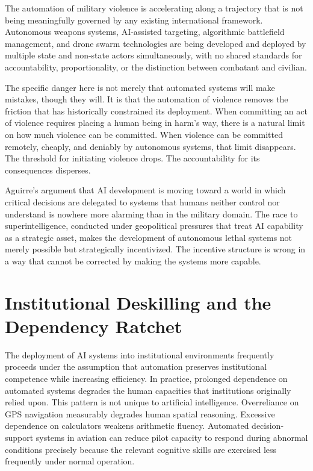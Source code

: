 \documentclass[12pt, a4paper]{article}
\theoremstyle{remark}
\begin{document}
The automation of military violence is accelerating along a trajectory that is not being meaningfully governed by any existing international framework. Autonomous weapons systems, AI-assisted targeting, algorithmic battlefield management, and drone swarm technologies are being developed and deployed by multiple state and non-state actors simultaneously, with no shared standards for accountability, proportionality, or the distinction between combatant and civilian.

The specific danger here is not merely that automated systems will make mistakes, though they will. It is that the automation of violence removes the friction that has historically constrained its deployment. When committing an act of violence requires placing a human being in harm's way, there is a natural limit on how much violence can be committed. When violence can be committed remotely, cheaply, and deniably by autonomous systems, that limit disappears. The threshold for initiating violence drops. The accountability for its consequences disperses.

Aguirre's argument that AI development is moving toward a world in which critical decisions are delegated to systems that humans neither control nor understand is nowhere more alarming than in the military domain. The race to superintelligence, conducted under geopolitical pressures that treat AI capability as a strategic asset, makes the development of autonomous lethal systems not merely possible but strategically incentivized. The incentive structure is wrong in a way that cannot be corrected by making the systems more capable.

\section{Institutional Deskilling and the Dependency Ratchet}

The deployment of AI systems into institutional environments frequently proceeds under the assumption that automation preserves institutional competence while increasing efficiency. In practice, prolonged dependence on automated systems degrades the human capacities that institutions originally relied upon. This pattern is not unique to artificial intelligence. Overreliance on GPS navigation measurably degrades human spatial reasoning. Excessive dependence on calculators weakens arithmetic fluency. Automated decision-support systems in aviation can reduce pilot capacity to respond during abnormal conditions precisely because the relevant cognitive skills are exercised less frequently under normal operation.
\end{document}
